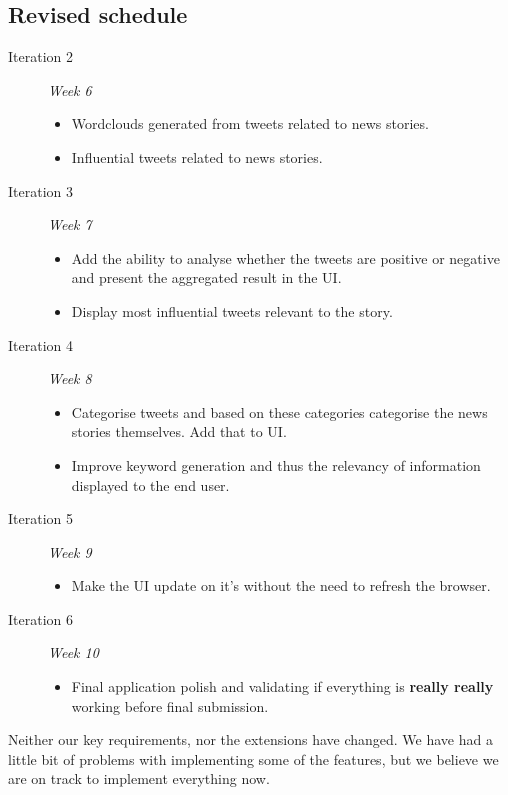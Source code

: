 \documentclass[a4paper,12pt]{article}
\begin{document}
	\subsection{Revised schedule}
	\begin{description}
   \item[Iteration 2] \emph{Week 6}
   \begin{itemize}
     \item Wordclouds generated from tweets related to news stories.
     \item Influential tweets related to news stories.
   \end{itemize}
   \item[Iteration 3] \emph{Week 7}
   \begin{itemize}
     \item Add the ability to analyse whether the tweets are positive or negative and present the aggregated result in the UI.
     \item Display most influential tweets relevant to the story.
   \end{itemize}
   \item[Iteration 4] \emph{Week 8}
   \begin{itemize}
     \item Categorise tweets and based on these categories categorise the news stories themselves. Add that to UI.
     \item Improve keyword generation and thus the relevancy of information displayed to the end user.
   \end{itemize}
   \item[Iteration 5] \emph{Week 9}
   \begin{itemize}
     \item Make the UI update on it's without the need to refresh the browser.
   \end{itemize}
   \item[Iteration 6] \emph{Week 10}
   \begin{itemize}
     \item Final application polish and validating if everything is \textbf{really really} working before final submission.
   \end{itemize}
  \end{description}
	
	Neither our key requirements, nor the extensions have changed. We have had a little bit of problems with implementing some of the features, but we believe we are on track to implement everything now.
  
\end{document}
